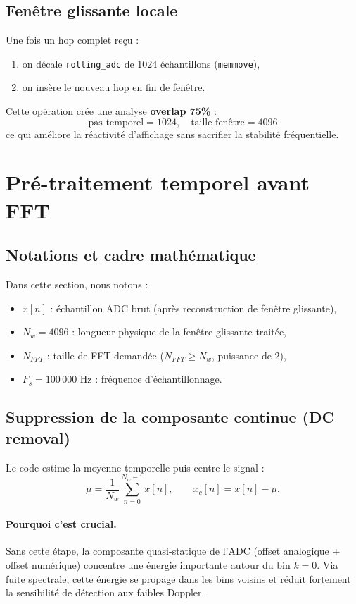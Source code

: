 \documentclass[a4paper,11pt]{article}
\begin{document}
\subsection{Fen\^etre glissante locale}

Une fois un hop complet re\c{c}u :
\begin{enumerate}[leftmargin=2em]
  \item on d\'ecale \texttt{rolling\_adc} de 1024 \'echantillons (\texttt{memmove}),
  \item on ins\`ere le nouveau hop en fin de fen\^etre.
\end{enumerate}

Cette op\'eration cr\'ee une analyse \textbf{overlap 75\%} :
\[
\text{pas temporel} = 1024, \quad \text{taille fen\^etre} = 4096
\]
ce qui am\'eliore la r\'eactivit\'e d'affichage sans sacrifier la stabilit\'e fr\'equentielle.

\section{Pr\'e-traitement temporel avant FFT}

\subsection{Notations et cadre math\'ematique}

Dans cette section, nous notons :
\begin{itemize}[leftmargin=2em]
  \item \(x[n]\) : \'echantillon ADC brut (apr\`es reconstruction de fen\^etre glissante),
  \item \(N_w = 4096\) : longueur physique de la fen\^etre glissante trait\'ee,
  \item \(N_{FFT}\) : taille de FFT demand\'ee (\(N_{FFT}\ge N_w\), puissance de 2),
  \item \(F_s = 100\,000\) Hz : fr\'equence d'\'echantillonnage.
\end{itemize}

\subsection{Suppression de la composante continue (DC removal)}

Le code estime la moyenne temporelle puis centre le signal :
\[
\mu = \frac{1}{N_w}\sum_{n=0}^{N_w-1}x[n],
\qquad
x_c[n]=x[n]-\mu.
\]

\paragraph{Pourquoi c'est crucial.}
Sans cette \'etape, la composante quasi-statique de l'ADC (offset analogique + offset num\'erique) concentre une \'energie importante autour du bin \(k=0\). Via fuite spectrale, cette \'energie se propage dans les bins voisins et r\'eduit fortement la sensibilit\'e de d\'etection aux faibles Doppler.
\end{document}
